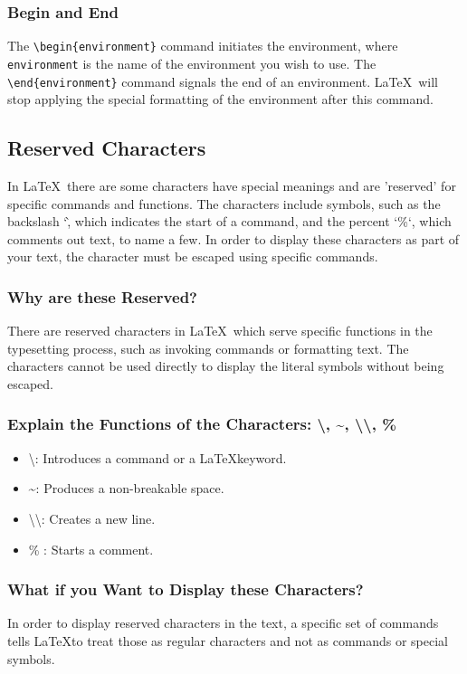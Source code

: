 \documentclass[12pt,journal,compsoc]{IEEEtran}
\begin{document}
\subsubsection{Begin and End}
The \texttt{\textbackslash begin\{environment\}} command initiates the environment, where \texttt{environment} is the name of the environment you wish to use.  The \texttt{\textbackslash end\{environment\}} command signals the end of an environment. \LaTeX\ will stop applying the special formatting of the environment after this command.  

\subsection{Reserved Characters}
In \LaTeX\, there are some characters have special meanings and are 'reserved' for specific commands and functions. The characters include symbols, such as the backslash `\`, which indicates the start of a command, and the percent `\%`, which comments out text, to name a few. In order to display these characters as part of your text, the character must be escaped using specific commands. 

\subsubsection{Why are these Reserved?}
There are reserved characters in \LaTeX\, which serve specific functions in the typesetting process, such as invoking commands or formatting text. The characters cannot be used directly to display the literal symbols without being escaped.

\subsubsection{Explain the Functions of the Characters: \textbackslash , \textasciitilde , \textbackslash\textbackslash , \%}

\begin{itemize}
    \item \textbackslash: Introduces a command or a \LaTeX keyword.
    \item \textasciitilde: Produces a non-breakable space.
    \item \textbackslash\textbackslash: Creates a new line.
    \item \% : Starts a comment.
\end{itemize}

\subsubsection{What if you Want to Display these Characters?}
In order to display reserved characters in the text, a specific set of commands tells \LaTeX to treat those as regular characters and not as commands or special symbols.
\end{document}
